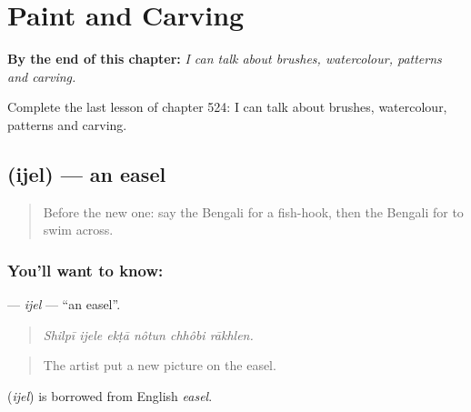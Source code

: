 
\chapter{Paint and Carving}
\label{ch:bn-paint-and-carving}

\begin{chapteropening}
\textbf{By the end of this chapter:} \emph{I can talk about brushes, watercolour, patterns and carving.}

Complete the last lesson of chapter 524: I can talk about brushes, watercolour, patterns and carving.
\end{chapteropening}

\section[\texorpdfstring{\bn{ইজেল} (ijel)}{ইজেল (ijel)}]{ (ijel) — an easel}

\label{lesson:BN-C524-ijel}



\begin{quote}
Before the new one: say the Bengali for a fish-hook, then the Bengali for to swim across.
\end{quote}

\subsection*{You'll want to know: }
\textbf{} — \emph{ijel} — \textquotedblleft{}an easel\textquotedblright{}.

\begin{quote}
     
\end{quote}

\begin{quote}
\emph{Shilpī ijele ekṭā nôtun chhôbi rākhlen.}
\end{quote}

\begin{quote}
The artist put a new picture on the easel.
\end{quote}

\begin{cousinweb}
\textbf{} (\emph{ijel}) is borrowed from English \emph{easel}.
\end{cousinweb}

